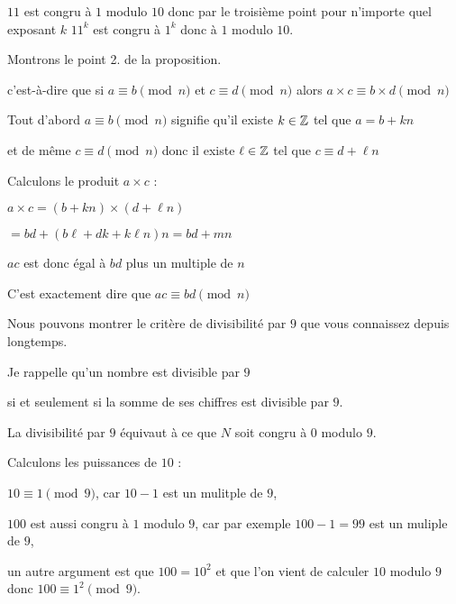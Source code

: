 \change

  $11$ est congru à $1$ modulo $10$ donc par le troisième
point pour n'importe quel exposant $k$ $11^k$ est congru 
à $1^k$ donc à $1$ modulo $10$.

\change

Montrons le point 2. de la proposition.

c'est-à-dire que si $a \equiv b \pmod n$ et $c \equiv d \pmod n$ alors $a\times c \equiv b \times d \pmod n$

\change

Tout d'abord  $a \equiv b \pmod n$ signifie qu'il existe $k \in \mathbb{Z}$ tel que $a=b + kn$ 

\change

et de même $c \equiv d \pmod n$ donc il existe $\ell \in \mathbb{Z}$ tel que $c \equiv d + \ell n$

\change

Calculons le produit $a\times c$ :

$a\times c = (b+kn)\times(d+\ell n)$

$ = bd + (b \ell + d k + k\ell n)n = bd + mn$

$ac$ est donc égal à $bd$ plus un multiple de $n$

\change

C'est exactement dire que $ac \equiv bd \pmod n$


\diapo

Nous pouvons montrer le critère de divisibilité par $9$ que vous 
connaissez depuis longtemps.

\change

Je rappelle qu'un nombre est divisible par $9$

si et seulement si la somme de ses chiffres est divisible par $9$.

\change

La divisibilité par $9$ équivaut à ce que $N$ soit congru à $0$ modulo $9$.

\change

Calculons les puissances de $10$ :

 $10 \equiv 1 \pmod 9$, car $10-1$ est un mulitple de $9$,

\change

$100$ est aussi congru à $1$ modulo $9$, car
par exemple $100-1=99$ est un muliple de $9$,

un autre argument est que $100=10^2$ et que l'on vient de calculer $10$ modulo $9$ donc $100 \equiv 1^2 \pmod 9$.

